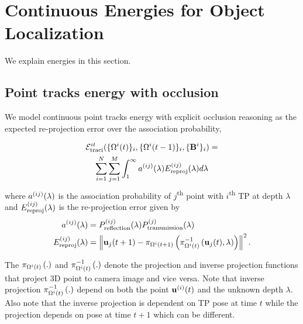 \section{Continuous Energies for Object Localization}
We explain energies in this section.

\subsection{Point tracks energy with occlusion}
\label{sec:totalContPtTracksEnergy}
We model continuous point tracks energy with explicit occlusion reasoning as
the expected re-projection error over the association probability,

\begin{multline}
  \mathcal{E}^{it}_{\text{traci}}(\{ \Omega^{i}(t) \}_i, \{ \Omega^{i}(t-1) \}_i, \{\mathbf{B}^{i}\}_i ) = \\
    \sum_{i=1}^{N} 
    \sum_{j = 1}^{M}
    \int_1^\infty a^{(ij)}(\lambda)E^{(ij)}_{\text{reproj}}(\lambda) d\lambda
\end{multline}
where $a^{(ij)}(\lambda)$ is the association probability of
$j$\textsuperscript{th} point with $i$\textsuperscript{th} TP at depth $\lambda$
and $E^{(ij)}_{\text{reproj}}(\lambda)$ is the re-projection error given by
%
\begin{align}
  a^{(ij)}(\lambda) &= P^{(ij)}_{\text{reflection}}(\lambda)P^{(j)}_{\text{transmission}}(\lambda)\\
  E^{(ij)}_{\text{reproj}}(\lambda) &= \left\|\mathbf{u}_j(t+1) - \pi_{\Omega^{i}(t+1)}\left(\pi^{-1}_{\Omega^{i}(t)}\left(\mathbf{u}_j(t), \lambda\right)\right)\right\|^2 .
  \label{eq:reprojerror}
\end{align}

The  $\pi_{\Omega^{i}(t)}\left(.\right)$ and $\pi^{-1}_{\Omega^{i}(t)}\left(.\right)$ denote the projection and
inverse projection functions that project 3D point to camera image and vice
versa. Note that inverse projection $\pi^{-1}_{\Omega^{i}(t)}\left(.\right)$ depend on both the
point $\mathbf{u}^{(i)}(t)$ and the unknown depth $\lambda$. Also note that the inverse projection is dependent on TP pose at time $t$ while the projection depends on pose at time $t+1$ which can be different.

